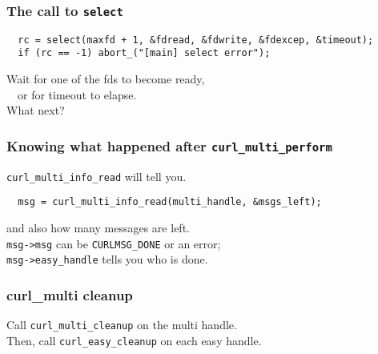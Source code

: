 \documentclass[aspectratio=43]{beamer}
\newenvironment{changemargin}[1]{%
  \begin{list}{}{%
    \setlength{\topsep}{0pt}%
    \setlength{\leftmargin}{#1}%
    \setlength{\rightmargin}{1em}
    \setlength{\listparindent}{\parindent}%
    \setlength{\itemindent}{\parindent}%
    \setlength{\parsep}{\parskip}%
  }%
  \item[]}{\end{list}}
\begin{document}
\begin{frame}[fragile]
  \frametitle{The call to {\tt select}}

\begin{lstlisting}
  rc = select(maxfd + 1, &fdread, &fdwrite, &fdexcep, &timeout);
  if (rc == -1) abort_("[main] select error");
\end{lstlisting}

  \begin{changemargin}{2cm}
    Wait for one of the fds to become ready,\\ ~~or for timeout to elapse. \\[1em]
    What next?\\
  \end{changemargin}
\end{frame}

\begin{frame}[fragile]
  \frametitle{Knowing what happened after {\tt curl\_multi\_perform}}

  \begin{changemargin}{2cm}
    {\tt curl\_multi\_info\_read} will tell you.
  \end{changemargin}
\begin{lstlisting}
  msg = curl_multi_info_read(multi_handle, &msgs_left);
\end{lstlisting}
  \begin{changemargin}{2cm}
    and also how many messages are left.\\[1em]
    {\tt msg->msg} can be {\tt CURLMSG\_DONE} or an error;\\
    {\tt msg->easy\_handle} tells you who is done.
  \end{changemargin}

\end{frame}



\begin{frame}
  \frametitle{curl\_multi cleanup}

  \begin{changemargin}{2cm}
    Call {\tt curl\_multi\_cleanup} on the multi handle.\\[1em]
    Then, call {\tt curl\_easy\_cleanup} on each easy handle.
  \end{changemargin}

\end{frame}
\end{document}
